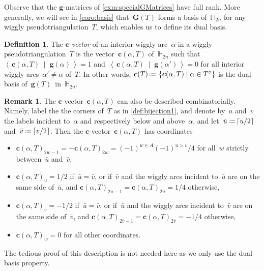 \documentclass{amsart}
\theoremstyle{definition}
\newtheorem{definition}[theorem]{Definition}
\newtheorem{remark}[theorem]{Remark}
\newcommand{\HH}{\mathbb{H}} %
\renewcommand{\b}[1]{{\boldsymbol{#1}}} %
\newcommand{\set}[2]{\left\{ #1 \;\middle|\; #2 \right\}} %
\newcommand{\dotprod}[2]{\left\langle \, #1 \; \middle| \; #2 \, \right\rangle} %
\newcommand{\eqdef}{\mbox{\,\raisebox{0.2ex}{\scriptsize\ensuremath{\mathrm:}}\ensuremath{=}\,}} %
\newcommand{\darkblue}{\color{darkblue}} %
\newcommand{\defn}[1]{\textsl{\darkblue #1}} %
\begin{document}
Observe that the $\b{g}$-matrices of \cref{exm:specialGMatrices} have full rank.
More generally, we will see in \cref{coro:basis} that~$\b{G}(T)$ forms a basis of~$\HH_{2n}$ for any wiggly pseudotriangulation~$T$, which enables us to define its dual basis.

\begin{definition}
\label{def:cvectors}
The \defn{$\b{c}$-vector} of an interior wiggly arc~$\alpha$ in a wiggly pseudotriangulation~$T$ is the vector~$\b{c}(\alpha, T)$ of~$\HH_{2n}$ such that~$\dotprod{\b{c}(\alpha, T)}{\b{g}(\alpha)} = 1$ and~$\dotprod{\b{c}(\alpha, T)}{\b{g}(\alpha')} = 0$ for all interior wiggly arcs~$\alpha' \ne \alpha$ of~$T$.
In other words, $\b{c}(T) \eqdef \set{\b{c}(\alpha, T)}{\alpha \in T^\circ}$ is the dual basis of~$\b{g}(T)$~in~$\HH_{2n}$.
\end{definition}

\begin{remark}
The $\b{c}$-vector~$\b{c}(\alpha, T)$ can also be described combinatorially.
Namely, label the the corners of~$T$ as in \cref{def:bijection1}, and denote by~$u$ and~$v$ the labels incident to~$\alpha$ and respectively below and above~$\alpha$, and let~$\bar u \eqdef \lceil u/2 \rceil$ and~$\bar v \eqdef \lceil v/2 \rceil$.
Then the $\b{c}$-vector~$\b{c}(\alpha, T)$ has coordinates
\begin{itemize}
\item $\b{c}(\alpha, T)_{2w-1} = - \b{c}(\alpha, T)_{2w} = (-1)^{w \in A} (-1)^{u>v}/4$ for all~$w$ strictly between~$\bar u$ and~$\bar v$,
\item $\b{c}(\alpha, T)_u = 1/2$ if~$\bar u = \bar v$, or if~$\bar v$ and the wiggly arcs incident to~$\bar u$ are on the same side of~$\bar u$, and $\b{c}(\alpha, T)_{2\bar u-1} = \b{c}(\alpha, T)_{2\bar u} = 1/4$ otherwise,
\item $\b{c}(\alpha, T)_v = -1/2$ if~$\bar u = \bar v$, or if~$\bar u$ and the wiggly arcs incident to~$\bar v$ are on the same side of~$\bar v$, and $\b{c}(\alpha, T)_{2\bar v-1} = \b{c}(\alpha, T)_{2\bar v} = -1/4$ otherwise,
\item $\b{c}(\alpha, T)_w = 0$ for all other coordinates.
\end{itemize}
The tedious proof of this description is not needed here as we only use the dual basis property.
\end{remark}
\end{document}
